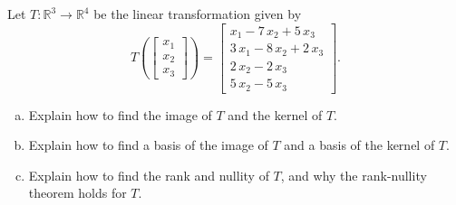 
\begin{exerciseStatement}
 Let \(T:\mathbb{R}^ 3  \to \mathbb{R}^ 4 \) be the linear transformation given by \[T\left(  \left[\begin{array}{c}
x_{1} \\
x_{2} \\
x_{3}
\end{array}\right]  \right) =  \left[\begin{array}{c}
x_{1} - 7 \, x_{2} + 5 \, x_{3} \\
3 \, x_{1} - 8 \, x_{2} + 2 \, x_{3} \\
2 \, x_{2} - 2 \, x_{3} \\
5 \, x_{2} - 5 \, x_{3}
\end{array}\right] .\]
\begin{enumerate}[(a)]
\item Explain how to find the image of \(T\) and the kernel of \(T\).
\item Explain how to find a basis of the image of \(T\) and a basis of the kernel of \(T\).
\item Explain how to find the rank and nullity of \(T\), and why the rank-nullity theorem holds for \(T\).
\end{enumerate}
    
\end{exerciseStatement}
    
